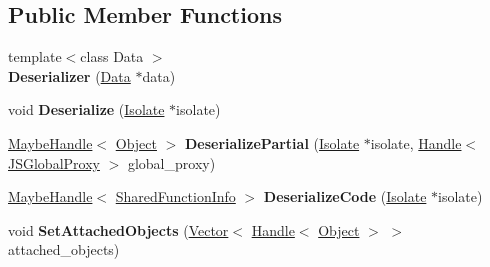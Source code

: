 \subsection*{Public Member Functions}
\begin{DoxyCompactItemize}
\item 
{\footnotesize template$<$class Data $>$ }\\{\bfseries Deserializer} (\hyperlink{classv8_1_1_data}{Data} $\ast$data)\hypertarget{classv8_1_1internal_1_1_deserializer_a62e81a0dbaa0c6b1dceedae98f395de4}{}\label{classv8_1_1internal_1_1_deserializer_a62e81a0dbaa0c6b1dceedae98f395de4}

\item 
void {\bfseries Deserialize} (\hyperlink{classv8_1_1internal_1_1_isolate}{Isolate} $\ast$isolate)\hypertarget{classv8_1_1internal_1_1_deserializer_a92f49a4e6c3ac1798069c2f3b1c49a1d}{}\label{classv8_1_1internal_1_1_deserializer_a92f49a4e6c3ac1798069c2f3b1c49a1d}

\item 
\hyperlink{classv8_1_1internal_1_1_maybe_handle}{Maybe\+Handle}$<$ \hyperlink{classv8_1_1internal_1_1_object}{Object} $>$ {\bfseries Deserialize\+Partial} (\hyperlink{classv8_1_1internal_1_1_isolate}{Isolate} $\ast$isolate, \hyperlink{classv8_1_1internal_1_1_handle}{Handle}$<$ \hyperlink{classv8_1_1internal_1_1_j_s_global_proxy}{J\+S\+Global\+Proxy} $>$ global\+\_\+proxy)\hypertarget{classv8_1_1internal_1_1_deserializer_a0465a8585cc172438efe833a84c6a224}{}\label{classv8_1_1internal_1_1_deserializer_a0465a8585cc172438efe833a84c6a224}

\item 
\hyperlink{classv8_1_1internal_1_1_maybe_handle}{Maybe\+Handle}$<$ \hyperlink{classv8_1_1internal_1_1_shared_function_info}{Shared\+Function\+Info} $>$ {\bfseries Deserialize\+Code} (\hyperlink{classv8_1_1internal_1_1_isolate}{Isolate} $\ast$isolate)\hypertarget{classv8_1_1internal_1_1_deserializer_a56e2234ff58a8b4932575032b978f9d6}{}\label{classv8_1_1internal_1_1_deserializer_a56e2234ff58a8b4932575032b978f9d6}

\item 
void {\bfseries Set\+Attached\+Objects} (\hyperlink{classv8_1_1internal_1_1_vector}{Vector}$<$ \hyperlink{classv8_1_1internal_1_1_handle}{Handle}$<$ \hyperlink{classv8_1_1internal_1_1_object}{Object} $>$ $>$ attached\+\_\+objects)\hypertarget{classv8_1_1internal_1_1_deserializer_a43d1531a77b7456e390e15e898ae737b}{}\label{classv8_1_1internal_1_1_deserializer_a43d1531a77b7456e390e15e898ae737b}

\end{DoxyCompactItemize}
